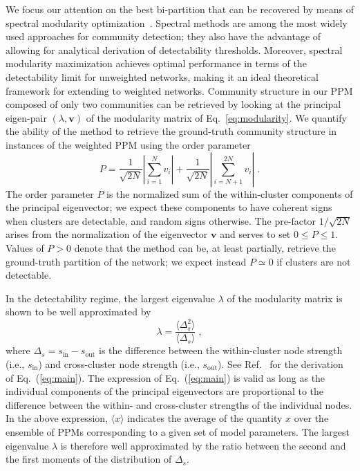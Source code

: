 \documentclass[a4paper,pre,superscriptaddress,floatfix,nofootinbib,twocolumn]{revtex4-1}
\begin{document}
We focus our attention on the best bi-partition that can be recovered by means of spectral modularity optimization~\cite{newman2006modularity}. Spectral methods are among the most widely used approaches for community detection; they also have the advantage of allowing for analytical derivation of detectability thresholds. Moreover, spectral modularity maximization achieves optimal performance in terms of the detectability limit for unweighted networks, making it an ideal theoretical framework for extending to weighted networks. Community structure in our PPM composed of only two communities can be retrieved by looking at the principal eigen-pair $(\lambda, \mathbf{v})$ of the modularity matrix of Eq.~\eqref{eq:modularity}. We quantify the ability of the method to retrieve the ground-truth community structure in instances of the weighted PPM using the order parameter
\begin{equation}
P = \frac{1}{\sqrt{2N}}  \left|\sum_{i=1}^{N} v_i \right|  + \frac{1}{\sqrt{2N}}  \left|\sum_{i=N+1}^{2N} v_i \right|   \; .
    \label{eq:order}
\end{equation}
The order parameter $P$ is the normalized sum of the within-cluster components of the principal eigenvector; we expect these components to have coherent signs when clusters are detectable, and random signs otherwise. The pre-factor $1/\sqrt{2N}$ arises from the normalization of the eigenvector $\mathbf{v}$ and serves to set $0 \leq P \leq 1$. Values of $P > 0$ denote that the method can be, at least partially, retrieve the ground-truth partition of the network; we expect instead $P \simeq 0$ if clusters are not detectable.


In the detectability regime, the largest eigenvalue $\lambda$ of the modularity matrix is shown to be well approximated by
\begin{equation}
\lambda = \frac{\langle \Delta_{s}^2 \rangle}{\langle \Delta_{s} \rangle} \; ,
\label{eq:main}
\end{equation}
where $\Delta_{s}=s_\text{in} - s_\text{out}$ is the difference between the within-cluster node strength (i.e., $s_\text{in}$)
and cross-cluster node strength (i.e., $s_\text{out}$).
See Ref.~\cite{radicchi2013detectability} for the derivation of Eq.~(\ref{eq:main}).
The expression of Eq.~(\ref{eq:main}) is valid as long as the individual components of the principal eigenvectors are
proportional to the difference between the within- and cross-cluster strengths of the individual nodes.
In the above expression,
$\langle x \rangle$ indicates the average of the quantity $x$ over the ensemble of PPMs corresponding to a given set of model parameters. The largest eigenvalue $\lambda$ is therefore well approximated by the ratio between the second and the first moments of the distribution of $\Delta_{s}$.
\end{document}
